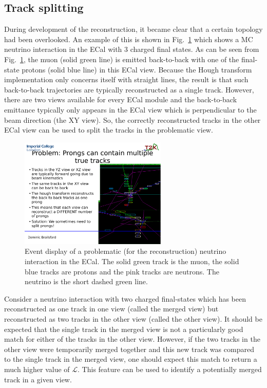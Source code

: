 \subsection{Track splitting}
\label{subsec:TrackSplitting}
During development of the reconstruction, it became clear that a certain topology had been overlooked.  An example of this is shown in Fig.~\ref{fig:MergedTrackEventDisplay} which shows a MC neutrino interaction in the ECal with 3 charged final states.  As can be seen from Fig.~\ref{fig:MergedTrackEventDisplay}, the muon (solid green line) is emitted back-to-back with one of the final-state protons (solid blue line) in this ECal view.  Because the Hough transform implementation only concerns itself with straight lines, the result is that such back-to-back trajectories are typically reconstructed as a single track.  However, there are two views available for every ECal module and the back-to-back emittance typically only appears in the ECal view which is perpendicular to the beam direction (the XY view).  So, the correctly reconstructed tracks in the other ECal view can be used to split the tracks in the problematic view.  
\begin{figure}
  \centering
  \includegraphics[width=7cm]{images/hough_3d_matching/MergedTrackEventDisplay.pdf}
  \caption{Event display of a problematic (for the reconstruction) neutrino interaction in the ECal.  The solid green track is the muon, the solid blue tracks are protons and the pink tracks are neutrons.  The neutrino is the short dashed green line.}
  \label{fig:MergedTrackEventDisplay}
\end{figure}
\newline
\newline
Consider a neutrino interaction with two charged final-states which has been reconstructed as one track in one view (called the merged view) but reconstructed as two tracks in the other view (called the other view).  It should be expected that the single track in the merged view is not a particularly good match for either of the tracks in the other view.  However, if the two tracks in the other view were temporarily merged together and this new track was compared to the single track in the merged view, one should expect this match to return a much higher value of $\mathcal{L}$.  This feature can be used to identify a potentially merged track in a given view.
